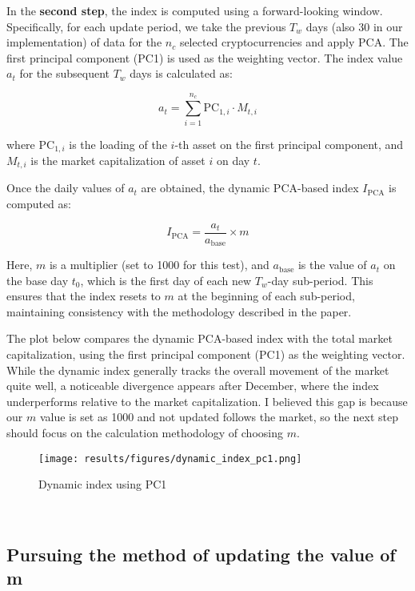 \documentclass[12pt]{article}
\begin{document}
In the \textbf{second step}, the index is computed using a forward-looking window. Specifically, for each update period, we take the previous \( T_w \) days (also 30 in our implementation) of data for the \( n_c \) selected cryptocurrencies and apply PCA. The first principal component (PC1) is used as the weighting vector. The index value \( a_t \) for the subsequent \( T_w \) days is calculated as:

\[
a_t = \sum_{i=1}^{n_c} \text{PC}_{1,i} \cdot M_{t,i}
\]

where \( \text{PC}_{1,i} \) is the loading of the \( i \)-th asset on the first principal component, and \( M_{t,i} \) is the market capitalization of asset \( i \) on day \( t \).

Once the daily values of \( a_t \) are obtained, the dynamic PCA-based index \( I_{\text{PCA}} \) is computed as:

\[
I_{\text{PCA}} = \frac{a_t}{a_{\text{base}}} \times m
\]

Here, \( m \) is a multiplier (set to 1000 for this test), and \( a_{\text{base}} \) is the value of \( a_t \) on the base day \( t_0 \), which is the first day of each new \( T_w \)-day sub-period. This ensures that the index resets to \( m \) at the beginning of each sub-period, maintaining consistency with the methodology described in the paper.

The plot below compares the dynamic PCA-based index with the total market capitalization, using the first principal component (PC1) as the weighting vector. While the dynamic index generally tracks the overall movement of the market quite well, a noticeable divergence appears after December, where the index underperforms relative to the market capitalization. I believed this gap is because our $m$ value is set as 1000 and not updated follows the market, so the next step should focus on the calculation methodology of choosing $m$.

\begin{figure}[H]
    \centering
    \texttt{[image: results/figures/dynamic\_index\_pc1.png]}
    \caption{Dynamic index using PC1}
    \label{fig:di1}
\end{figure}

\

\subsection{Pursuing the method of updating the value of m}
\end{document}
